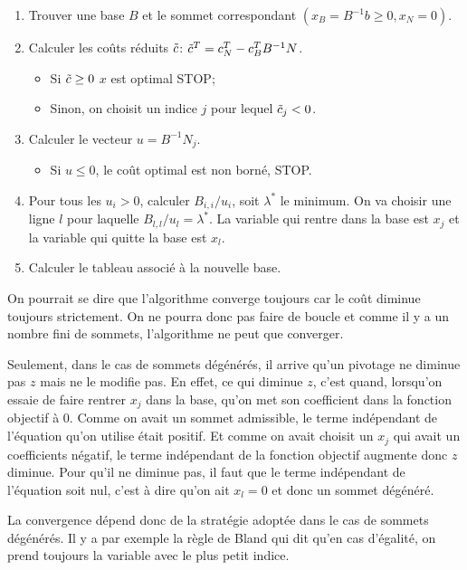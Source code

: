 \begin{enumerate}
  \item Trouver une base $B$ et le sommet correspondant
    $(x_B = B^{-1}b \geq 0, x_N = 0)$.
  \item Calculer les coûts réduits $\tilde{c}$:
    $\tilde{c}^T = c_N^T - c_B^{T}B^{-1}N$.
    \begin{itemize}
      \item Si $\tilde{c} \geq 0$ $x$ est optimal STOP;
      \item Sinon, on choisit un indice $j$ pour lequel $\tilde{c}_j < 0$.
    \end{itemize}
  \item Calculer le vecteur $u = B^{-1}N_j$.
    \begin{itemize}
      \item Si $u \leq 0$, le coût optimal est non borné, STOP.
    \end{itemize}
  \item Pour tous les $u_i > 0$, calculer $B_{i,i}/u_i$,
    soit $\lambda^*$ le minimum.
    On va choisir une ligne $l$ pour laquelle $B_{l,l}/u_l = \lambda^*$.
    La variable qui rentre dans la base est $x_j$ et la variable qui
    quitte la base est $x_l$.
  \item
    Calculer le tableau associé à la nouvelle base.
\end{enumerate}
On pourrait se dire que l'algorithme converge toujours
car le coût diminue toujours strictement.
On ne pourra donc pas faire de boucle et
comme il y a un nombre fini de sommets,
l'algorithme ne peut que converger.

Seulement, dans le cas de sommets dégénérés, il arrive qu'un pivotage
ne diminue pas $z$ mais ne le modifie pas.
En effet, ce qui diminue $z$, c'est quand,
lorsqu'on essaie de faire rentrer $x_j$ dans la base,
qu'on met son coefficient dans la fonction objectif à 0.
Comme on avait un sommet admissible, le terme indépendant de l'équation
qu'on utilise était positif.
Et comme on avait choisit un $x_j$ qui avait un coefficients négatif,
le terme indépendant de la fonction objectif augmente donc $z$ diminue.
Pour qu'il ne diminue pas,
il faut que le terme indépendant de l'équation soit nul, c'est à dire
qu'on ait $x_l = 0$ et donc un sommet dégénéré.

La convergence dépend donc de la stratégie adoptée dans le cas de sommets
dégénérés.
Il y a par exemple la règle de Bland qui dit qu'en cas d'égalité,
on prend toujours la variable avec le plus petit indice.


